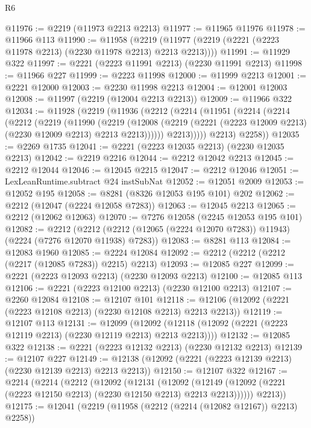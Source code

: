 \begin{lexlean}{R6}
\begin{coremodule}
@11976 := @2219 (@11973 @2213 @2213)
@11977 := @11965 @11976
@11978 := @11966 @113
@11990 := @11958
    (@2219 (@11977 (@2219 (@2221 (@2223 @11978 @2213) (@2230 @11978 @2213) @2213 @2213))))
@11991 := @11929 @322
@11997 := @2221 (@2223 @11991 @2213) (@2230 @11991 @2213)
@11998 := @11966 @227
@11999 := @2223 @11998
@12000 := @11999 @2213
@12001 := @2221 @12000
@12003 := @2230 @11998 @2213
@12004 := @12001 @12003
@12008 := @11997 (@2219 (@12004 @2213 @2213))
@12009 := @11966 @322
@12034 := @11928
    (@2219
      (@11936
        (@2212
          (@2214
            (@11951
              (@2214
                (@2214
                  (@2212
                    (@2219
                      (@11990
                        (@2219
                          (@12008
                            (@2219
                              (@2221 (@2223 @12009 @2213) (@2230 @12009 @2213) @2213 @2213))))))
                    @2213)))))
          @2213)
        @2258))
@12035 := @2269 @1735
@12041 := @2221 (@2223 @12035 @2213) (@2230 @12035 @2213)
@12042 := @2219 @2216
@12044 := @2212 @12042 @2213
@12045 := @2212 @12044
@12046 := @12045 @2215
@12047 := @2212 @12046
@12051 := LexLeanRuntime.subtract @24 instSubNat
@12052 := @12051 @2009
@12053 := @12052 @195
@12058 := @8281 (@8326 @12053 @195 @101) @202
@12062 := @2212 (@12047 (@2224 @12058 @7283))
@12063 := @12045 @2213
@12065 := @2212 (@12062 @12063)
@12070 := @7276 @12058 (@2245 @12053 @195 @101)
@12082 := @2212
    (@2212 (@2212 (@12065 (@2224 @12070 @7283)) @11943) (@2224 (@7276 @12070 @11938) @7283))
@12083 := @8281 @113
@12084 := @12083 @1960
@12085 := @2224 @12084
@12092 := @2212 (@2212 (@2212 (@2217 (@12085 @7283)) @2215) @2213)
@12093 := @12085 @227
@12099 := @2221 (@2223 @12093 @2213) (@2230 @12093 @2213)
@12100 := @12085 @113
@12106 := @2221 (@2223 @12100 @2213) (@2230 @12100 @2213)
@12107 := @2260 @12084
@12108 := @12107 @101
@12118 := @12106 (@12092 (@2221 (@2223 @12108 @2213) (@2230 @12108 @2213) @2213 @2213))
@12119 := @12107 @113
@12131 := @12099
    (@12092 (@12118 (@12092 (@2221 (@2223 @12119 @2213) (@2230 @12119 @2213) @2213 @2213))))
@12132 := @12085 @322
@12138 := @2221 (@2223 @12132 @2213) (@2230 @12132 @2213)
@12139 := @12107 @227
@12149 := @12138 (@12092 (@2221 (@2223 @12139 @2213) (@2230 @12139 @2213) @2213 @2213))
@12150 := @12107 @322
@12167 := @2214
    (@2214
      (@2212
        (@12092
          (@12131
            (@12092
              (@12149 (@12092 (@2221 (@2223 @12150 @2213) (@2230 @12150 @2213) @2213 @2213))))))
        @2213))
@12175 := @12041 (@2219 (@11958 (@2212 (@2214 (@12082 @12167)) @2213) @2258))

\end{coremodule}
\end{lexlean}
